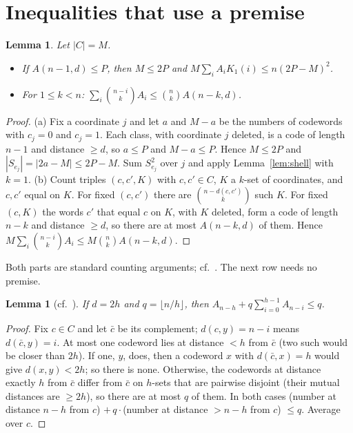 \documentclass[11pt]{article}
\newtheorem{lemma}[theorem]{Lemma}
\theoremstyle{remark}
\begin{document}
\section{Inequalities that use a premise}

\begin{lemma}\label{lem:prem}
Let $|C|=M$.
\begin{itemize}
\item[(a)] If $A(n-1,d)\le P$, then $M\le 2P$ and $M\sum_iA_iK_1(i)\le n(2P-M)^2$.
\item[(b)] For $1\le k<n$: $\sum_i\binom{n-i}{k}A_i\le\binom nk A(n-k,d)$.
\end{itemize}
\end{lemma}
\begin{proof}
(a) Fix a coordinate $j$ and let $a$ and $M-a$ be the numbers of codewords with $c_j=0$ and $c_j=1$. Each class,
with coordinate $j$ deleted, is a code of length $n-1$ and distance $\ge d$, so $a\le P$ and $M-a\le P$.
Hence $M\le 2P$ and $|S_{e_j}|=|2a-M|\le 2P-M$. Sum $S_{e_j}^2$ over $j$ and apply Lemma~\ref{lem:shell} with $k=1$.
(b) Count triples $(c,c',K)$ with $c,c'\in C$, $K$ a $k$-set of coordinates, and $c,c'$ equal on $K$.
For fixed $(c,c')$ there are $\binom{n-d(c,c')}{k}$ such $K$. For fixed $(c,K)$ the words $c'$ that equal $c$ on $K$,
with $K$ deleted, form a code of length $n-k$ and distance $\ge d$, so there are at most $A(n-k,d)$ of them.
Hence $M\sum_i\binom{n-i}kA_i\le M\binom nkA(n-k,d)$.
\end{proof}

Both parts are standard counting arguments; cf.~\cite{BBMOS}. The next row needs no premise.

\begin{lemma}[cf.\ \cite{MEL}]\label{lem:mel}
If $d=2h$ and $q=\lfloor n/h\rfloor$, then $A_{n-h}+q\sum_{i=0}^{h-1}A_{n-i}\le q$.
\end{lemma}
\begin{proof}
Fix $c\in C$ and let $\bar c$ be its complement; $d(c,y)=n-i$ means $d(\bar c,y)=i$. At most one codeword lies at
distance $<h$ from $\bar c$ (two such would be closer than $2h$). If one, $y$, does, then a codeword $x$ with
$d(\bar c,x)=h$ would give $d(x,y)<2h$; so there is none. Otherwise, the codewords at distance exactly $h$ from
$\bar c$ differ from $\bar c$ on $h$-sets that are pairwise disjoint (their mutual distances are $\ge2h$), so
there are at most $q$ of them. In both cases (number at distance $n-h$ from $c$) $+\,q\cdot$(number at distance
$>n-h$ from $c$) $\le q$. Average over $c$.
\end{proof}
\end{document}
